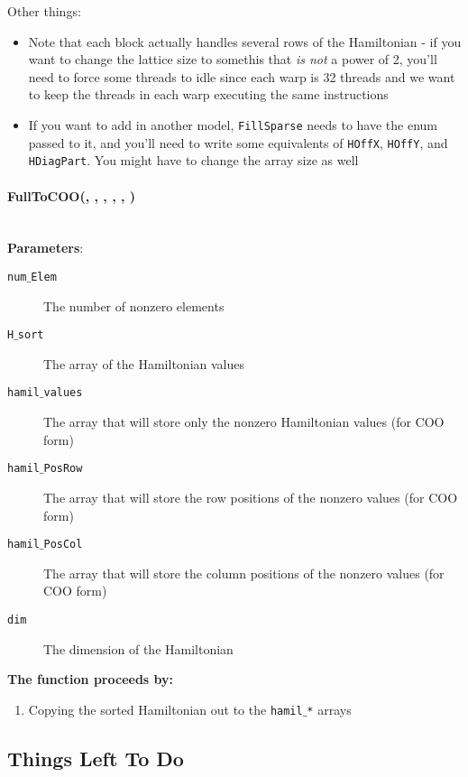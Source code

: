 \documentclass{article}
\begin{document}
Other things:
\begin{itemize}
\item{Note that each block actually handles several rows of the Hamiltonian - if you want to change the lattice size to somethis that \emph{is not} a power of 2, you'll need to force some threads to idle since each warp is 32 threads and we want to keep the threads in each warp executing the same instructions}
\item{If you want to add in another model, \texttt{FillSparse} needs to have the enum passed to it, and you'll need to write some equivalents of \texttt{HOffX}, \texttt{HOffY}, and \texttt{HDiagPart}. You might have to change the array size as well}
\end{itemize}

\paragraph{\cudaglobal \void FullToCOO(\int , \hamstruct, \cuDoubleComplex , \ptrint , \ptrint, \int) \\ \\}
\noindent\textbf{Parameters}:
\begin{description}
\item[\int \texttt{num$\_$Elem}] The number of nonzero elements
\item[\hamstruct \texttt{H$\_$sort}] The array of the Hamiltonian values
\item[\cuDoubleComplex \texttt{hamil$\_$values}] The array that will store only the nonzero Hamiltonian values (for COO form)
\item[\ptrint \texttt{hamil$\_$PosRow}] The array that will store the row positions of the nonzero values (for COO form)
\item[\ptrint \texttt{hamil$\_$PosCol}] The array that will store the column positions of the nonzero values (for COO form)
\item[\int \texttt{dim}] The dimension of the Hamiltonian

\end{description}

\noindent\textbf{The function proceeds by:}
\begin{enumerate}
\item{Copying the sorted Hamiltonian out to the \texttt{hamil$\_$*} arrays}
\end{enumerate}

\subsection{Things Left To Do}
\end{document}
